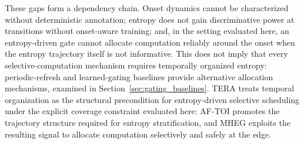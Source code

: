 \documentclass[a4paper,fleqn]{cas-dc}
\newcommand{\AFTOI}{\mbox{AF-TOI}\xspace}
\newcommand{\MHEG}{\mbox{MHEG}\xspace}
\begin{document}
These gaps form a dependency chain. Onset dynamics cannot be characterized
without deterministic annotation; entropy does not gain discriminative power at
transitions without onset-aware training; and, {\color{\revcolor}in the
setting evaluated here, an entropy-driven gate cannot allocate computation
reliably around the onset when the entropy trajectory itself is not
informative. This does not imply that every selective-computation mechanism
requires temporally organized entropy: periodic-refresh and learned-gating
baselines provide alternative allocation mechanisms, examined in
Section~\ref{sec:gating_baselines}.} TERA treats temporal organization as the
structural precondition for entropy-driven selective scheduling under the
explicit coverage constraint evaluated here: \AFTOI promotes the trajectory
structure required for entropy stratification, and \MHEG exploits the resulting
signal to allocate computation selectively and safely at the edge.
\end{document}
